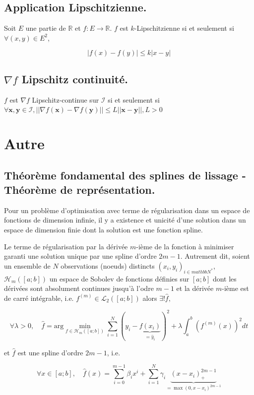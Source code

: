 \subsection{Application Lipschitzienne.} 

\noindent Soit $E$ une partie de $\mathbb{R}$ et $f : E \rightarrow \mathbb{R}$. $f$ est $k$-Lipschitzienne si et seulement si $\forall (x, y) \in E^2$, 

\begin{equation}
    | f(x) - f(y) | \le k|x - y|
\end{equation}

\subsection{$\nabla f$ Lipschitz continuité.} 

\noindent $f$ est $\nabla f$ Lipschitz-continue sur $\mathcal{I}$ si et seulement si $\forall \boldsymbol{x}, \boldsymbol{y} \in \mathcal{I}, || \nabla f(\boldsymbol{x})  - \nabla f(\boldsymbol{y}) || \le L || \boldsymbol{x} - \boldsymbol{y} ||, L > 0$ \newline

\newpage

\section{Autre}

\subsection{Théorème fondamental des splines de lissage - Théorème de représentation.}

\noindent Pour un problème d'optimisation avec terme de régularisation dans un espace de fonctions de dimension infinie, il y a existence et unicité d'une solution dans un espace de dimension finie dont la solution est une fonction spline. \newline

\noindent Le terme de régularisation par la dérivée $m$-ième de la fonction à minimiser garanti une solution unique par une spline d'ordre $2m-1$. Autrement dit, soient un ensemble de $N$ observations (noeuds) distincts $(x_i, y_i)_{i \in mathbb{N}^{*}}$, $\mathcal{H}_m([a;b])$ un espace de Sobolev de fonctions définies sur $[a;b]$ 
dont les dérivées sont absolument continues jusqu'à l'odre $m-1$ et la dérivée $m$-ième est de carré intégrable, i.e. $f^{(m)} \in \mathcal{L}_2([a;b])$ alors $\exists! \hat{f}, $

\begin{equation}
    \forall \lambda > 0, \quad \hat{f} = \text{arg} \min_{f \in \mathcal{H}_m([a;b])} \sum_{i=1}^{N} (y_i - \underbrace{f(x_i)}_{= \hat{y}_i})^{2} + \lambda \int_{a}^{b} (f^{(m)}(x))^2 dt
\end{equation}

\noindent et $\hat{f}$ est une spline d'ordre $2m-1$, i.e.

\begin{equation}
    \forall x \in [a;b], \quad \hat{f}(x) = \sum_{i=0}^{m-1} \beta_i x^i + \sum_{i=1}^{N} \gamma_i \underbrace{(x - x_i)_{+}^{2m-1}}_{= \max(0, x - x_i)^{2m-1}}
\end{equation}
